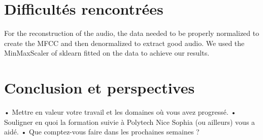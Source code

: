 \documentclass[11pt]{article}
\begin{document}
\pagebreak


\section{Difficultés rencontrées}



For the reconstruction of the audio, the data needed to be properly normalized to create the MFCC and then denormalized to extract good audio. We used the MinMaxScaler of sklearn fitted on the data to achieve our results.



\pagebreak

\section{Conclusion et perspectives}

•	Mettre en valeur votre travail et les domaines où vous avez progressé.
•	Souligner en quoi la formation suivie à Polytech Nice Sophia (ou ailleurs) vous a aidé.
•	Que comptez-vous faire dans les prochaines semaines ?

\pagebreak
\end{document}
